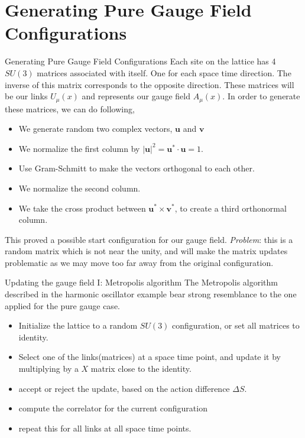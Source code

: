 \documentclass[10pt]{beamer}
\begin{document}
\section{Generating Pure Gauge Field Configurations}
\begin{frame}{Generating Pure Gauge Field Configurations}
Each site on the lattice has 4 $SU(3)$ matrices associated with itself. One for each space time direction. The inverse of this matrix corresponds to the opposite direction. These matrices will be our links $U_\mu(x)$ and represents our gauge field $A_\mu(x)$. In order to generate these matrices, we can do following,
\begin{itemize}
\item We generate random two complex vectors, $\mathbf{u}$ and $\mathbf{v}$
\item We normalize the first column by $|\mathbf{u}|^2=\mathbf{u}^*\cdot \mathbf{u}=1$.
\item Use Gram-Schmitt to make the vectors orthogonal to each other.
\item We normalize the second column.
\item We take the cross product between $\mathbf{u}^* \times \mathbf{v}^*$, to create a third orthonormal column.
\end{itemize}
This proved a possible start configuration for our gauge field. \textit{Problem}: this is a random matrix which is not near the unity, and will make the matrix updates problematic as we may move too far away from the original configuration.
\end{frame}


\begin{frame}{Updating the gauge field I: Metropolis algorithm}
The Metropolis algorithm described in the harmonic oscillator example bear strong resemblance to the one applied for the pure gauge case.  
\begin{itemize}
\item Initialize the lattice to a random $SU(3)$ configuration, or set all matrices to identity.
\item Select one of the links(matrices) at a space time point, and update it by multiplying by a $X$ matrix close to the identity.
\item accept or reject the update, based on the action difference $\Delta S$.
\item compute the correlator for the current configuration
\item repeat this for all links at all space time points.
\end{itemize}
\end{frame}
\end{document}
